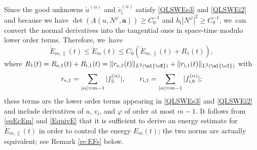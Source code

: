 Since the good unknowns $\check{u}^{(\alpha)}$ and $\check{v}_\mathrm{i}^{(\alpha)}$ satisfy \eqref{QLSWEe3} and \eqref{QLSWEi2} and because we have
$\det(A(u,N^\varphi,\bm{a})) \geq C_0^{-1}$ and $h_\mathrm{i}|N^\varphi|^2 \geq C_0^{-1}$, we~can convert the normal derivatives into the tangential ones in space-time modulo lower order terms.
Therefore, we~have
\begin{equation}\label{EquivE}
\check{E}_{m,\parallel}(t) \leq \check{E}_m(t) \leq C_0(\check{E}_{m,\parallel}(t) + R_1(t)),
\end{equation}
where $R_1(t)=R_{{\rm e},1}(t)+R_{{\rm i},1}(t)=\|r_{{\rm e},1}(t)\|_{L^2(\ul{\cE})}+\|r_{{\rm i},1}(t)\|_{L^2(\ul{\cI})}$ with
\[
r_{{\rm e},1} = \sum_{|\alpha|=m-1} |f_5^{(\alpha)}|, \qquad
r_{{\rm i},1} = \sum_{|\alpha|=m-1} |f_{{\rm i},8}^{(\alpha)}|;
\]
these terms are the lower order terms appearing in \eqref{QLSWEe3} and \eqref{QLSWEi2}
and include derivatives of $u$, $v_\mathrm{i}$, and $\varphi$ of order at most $m-1$.
It follows from \eqref{eqEcEm} and \eqref{EquivE} that it is sufficient to derive an energy estimate for $\check{E}_{m,\parallel}(t)$
in order to control the energy $E_m(t)$; the two norms are actually equivalent; see Remark \ref{re:EFs} below.

